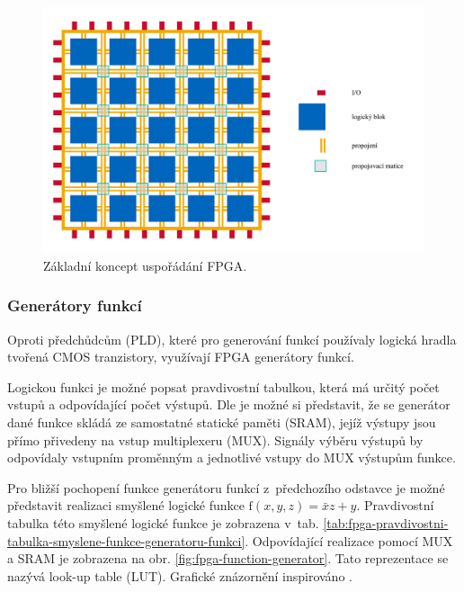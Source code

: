 \documentclass[a4paper, twoside, 11pt]{article}
\newcommand{\fbar}{\FloatBarrier}
\begin{document}
		\begin{figure}[htbp!]
			\centering
				\includegraphics[width=1\textwidth]{src/pdf/fpga-general-design.pdf} 
				\caption{Základní koncept uspořádání FPGA.}
				\label{fig:fpga-general-design}
		\end{figure}

		\fbar
		\subsubsection{Generátory funkcí}\label{subsubsec:generatory-funkci}
		Oproti předchůdcům (PLD), které pro generování funkcí používaly logická hradla tvořená CMOS tranzistory, využívají FPGA generátory funkcí.\par
		Logickou funkci je možné popsat pravdivostní tabulkou, která má určitý počet vstupů a odpovídající počet výstupů. Dle \cite{Sass2010} je možné si představit, že se generátor dané funkce skládá ze samostatné statické paměti (SRAM), jejíž výstupy jsou přímo přivedeny na vstup multiplexeru (MUX). Signály výběru výstupů by odpovídaly vstupním proměnným a jednotlivé vstupy do MUX výstupům funkce.\par
		Pro bližší pochopení funkce generátoru funkcí z~předchozího odstavce je možné představit realizaci smyšlené logické funkce $\text{f} (x, y, z) = \bar{x}z + y$. Pravdivostní tabulka této smyšlené logické funkce je zobrazena v~tab. \ref{tab:fpga-pravdivostni-tabulka-smyslene-funkce-generatoru-funkci}. Odpovídající realizace pomocí MUX a SRAM je zobrazena na obr. \ref{fig:fpga-function-generator}. Tato reprezentace se nazývá look-up table (LUT). Grafické znázornění inspirováno \cite{Sass2010}.
		
\end{document}

